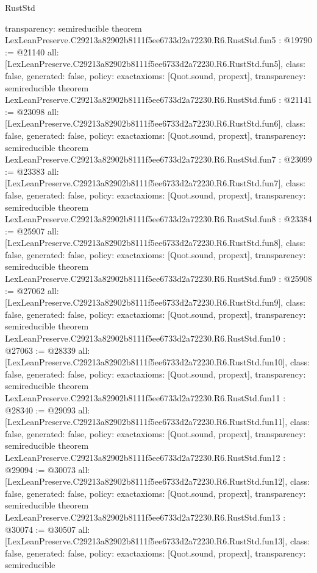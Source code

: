 \begin{lexlean}{RustStd}
\begin{coremodule}
{  transparency: semireducible
}
theorem LexLeanPreserve.C29213a82902b8111f5ee6733d2a72230.R6.RustStd.fun5 : @19790 := @21140 {
  all: [LexLeanPreserve.C29213a82902b8111f5ee6733d2a72230.R6.RustStd.fun5],
  class: false,
  generated: false,
  policy: exact{axioms: [Quot.sound, propext]},
  transparency: semireducible
}
theorem LexLeanPreserve.C29213a82902b8111f5ee6733d2a72230.R6.RustStd.fun6 : @21141 := @23098 {
  all: [LexLeanPreserve.C29213a82902b8111f5ee6733d2a72230.R6.RustStd.fun6],
  class: false,
  generated: false,
  policy: exact{axioms: [Quot.sound, propext]},
  transparency: semireducible
}
theorem LexLeanPreserve.C29213a82902b8111f5ee6733d2a72230.R6.RustStd.fun7 : @23099 := @23383 {
  all: [LexLeanPreserve.C29213a82902b8111f5ee6733d2a72230.R6.RustStd.fun7],
  class: false,
  generated: false,
  policy: exact{axioms: [Quot.sound, propext]},
  transparency: semireducible
}
theorem LexLeanPreserve.C29213a82902b8111f5ee6733d2a72230.R6.RustStd.fun8 : @23384 := @25907 {
  all: [LexLeanPreserve.C29213a82902b8111f5ee6733d2a72230.R6.RustStd.fun8],
  class: false,
  generated: false,
  policy: exact{axioms: [Quot.sound, propext]},
  transparency: semireducible
}
theorem LexLeanPreserve.C29213a82902b8111f5ee6733d2a72230.R6.RustStd.fun9 : @25908 := @27062 {
  all: [LexLeanPreserve.C29213a82902b8111f5ee6733d2a72230.R6.RustStd.fun9],
  class: false,
  generated: false,
  policy: exact{axioms: [Quot.sound, propext]},
  transparency: semireducible
}
theorem LexLeanPreserve.C29213a82902b8111f5ee6733d2a72230.R6.RustStd.fun10 : @27063 := @28339 {
  all: [LexLeanPreserve.C29213a82902b8111f5ee6733d2a72230.R6.RustStd.fun10],
  class: false,
  generated: false,
  policy: exact{axioms: [Quot.sound, propext]},
  transparency: semireducible
}
theorem LexLeanPreserve.C29213a82902b8111f5ee6733d2a72230.R6.RustStd.fun11 : @28340 := @29093 {
  all: [LexLeanPreserve.C29213a82902b8111f5ee6733d2a72230.R6.RustStd.fun11],
  class: false,
  generated: false,
  policy: exact{axioms: [Quot.sound, propext]},
  transparency: semireducible
}
theorem LexLeanPreserve.C29213a82902b8111f5ee6733d2a72230.R6.RustStd.fun12 : @29094 := @30073 {
  all: [LexLeanPreserve.C29213a82902b8111f5ee6733d2a72230.R6.RustStd.fun12],
  class: false,
  generated: false,
  policy: exact{axioms: [Quot.sound, propext]},
  transparency: semireducible
}
theorem LexLeanPreserve.C29213a82902b8111f5ee6733d2a72230.R6.RustStd.fun13 : @30074 := @30507 {
  all: [LexLeanPreserve.C29213a82902b8111f5ee6733d2a72230.R6.RustStd.fun13],
  class: false,
  generated: false,
  policy: exact{axioms: [Quot.sound, propext]},
  transparency: semireducible
}
\end{coremodule}
\end{lexlean}
